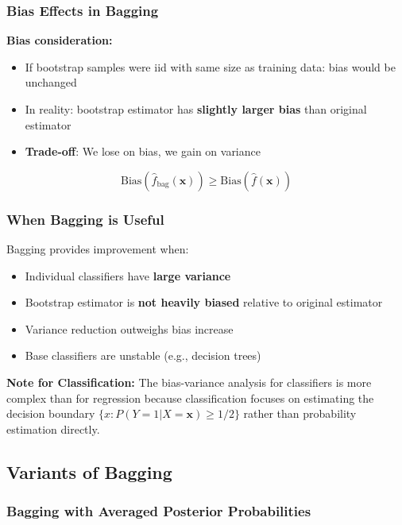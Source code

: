 \documentclass[12pt,a4paper]{article}
\begin{document}
\subsubsection{Bias Effects in Bagging}

\textbf{Bias consideration:}
\begin{itemize}
    \item If bootstrap samples were iid with same size as training data: bias would be unchanged
    \item In reality: bootstrap estimator has \textbf{slightly larger bias} than original estimator
    \item \textbf{Trade-off}: We lose on bias, we gain on variance
\end{itemize}

\begin{equation}
\text{Bias}(\hat{f}_{\text{bag}}(\mathbf{x})) \geq \text{Bias}(\hat{f}(\mathbf{x}))
\end{equation}

\subsubsection{When Bagging is Useful}

Bagging provides improvement when:
\begin{itemize}
    \item Individual classifiers have \textbf{large variance}
    \item Bootstrap estimator is \textbf{not heavily biased} relative to original estimator
    \item Variance reduction outweighs bias increase
    \item Base classifiers are unstable (e.g., decision trees)
\end{itemize}

\textbf{Note for Classification:}
The bias-variance analysis for classifiers is more complex than for regression because classification focuses on estimating the decision boundary $\{x : P(Y=1|X=\mathbf{x}) \geq 1/2\}$ rather than probability estimation directly.

\subsection{Variants of Bagging}

\subsubsection{Bagging with Averaged Posterior Probabilities}
\end{document}
